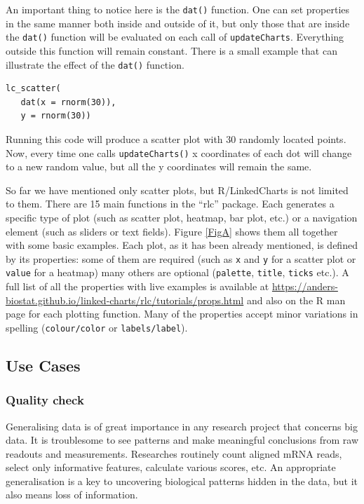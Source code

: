 \documentclass[twocolumn,10pt]{article}
\begin{document}
An important thing to notice here is the \texttt{dat()} function. One can set properties in the same manner both inside and outside of it, but only those that are inside the \texttt{dat()} function will be evaluated on each call of \texttt{updateCharts}. Everything outside this function will remain constant. There is a small example that can illustrate the effect of the \texttt{dat()} function.

\begin{verbatim}
lc_scatter(
   dat(x = rnorm(30)),
   y = rnorm(30))
\end{verbatim}

Running this code will produce a scatter plot with 30 randomly located points. Now, every time one calls \texttt{updateCharts()} x coordinates of each dot will change to a new random value, but all the y coordinates will remain the same.

So far we have mentioned only scatter plots, but R/LinkedCharts is not limited to them. There are 15 main functions in the ``rlc'' package. Each generates a specific type of plot (such as scatter plot, heatmap, bar plot, etc.) or a navigation element (such as sliders or text fields). Figure \ref{FigA} shows them all together with some basic examples. Each plot, as it has been already mentioned, is defined by its properties: some of them are required (such as \texttt{x} and \texttt{y} for a scatter plot or \texttt{value} for a heatmap) many others are optional (\texttt{palette}, \texttt{title}, \texttt{ticks} etc.). A full list of all the properties with live examples is available at \url{https://anders-biostat.github.io/linked-charts/rlc/tutorials/props.html} and also on the R man page for each plotting function. Many of the properties accept minor variations in spelling (\texttt{colour/color} or \texttt{labels/label}).

\subsection{Use Cases}
\subsubsection{Quality check}

Generalising data is of great importance in any research project that concerns big data. It is troublesome to see patterns and make meaningful conclusions from raw readouts and measurements. Researches routinely count aligned mRNA reads, select only informative features, calculate various scores, etc. An appropriate generalisation is a key to uncovering biological patterns hidden in the data, but it also means loss of information.
\end{document}
